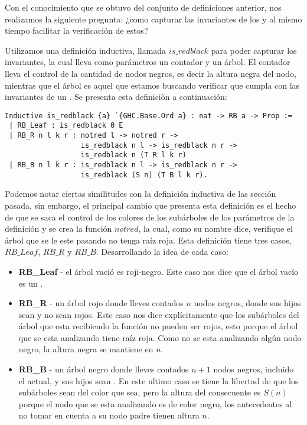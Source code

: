 Con el conocimiento que se obtuvo del conjunto de definiciones anterior, nos realizamos la
siguiente pregunta: ¿como capturar las invariantes de los {\arns} y al mismo tiempo facilitar la
verificaci\'on de estos?

Utilizamos una definición inductiva, llamada $is\_redblack$ para poder capturar los invariantes,
la cual lleva como parámetros un contador y un \'arbol. El contador lleva el control de la
cantidad de nodos negros, es decir la altura negra del nodo, mientras que el \'arbol es aquel que
estamos buscando verificar que cumpla con las invariantes de un {\arn}. Se presenta esta definici\`
on a continuaci\'on:

\begin{verbatim}
Inductive is_redblack {a} `{GHC.Base.Ord a} : nat -> RB a -> Prop :=
 | RB_Leaf : is_redblack 0 E
 | RB_R n l k r : notred l -> notred r ->
                  is_redblack n l -> is_redblack n r ->
                  is_redblack n (T R l k r)
 | RB_B n l k r : is_redblack n l -> is_redblack n r ->
                  is_redblack (S n) (T B l k r).
\end{verbatim}

Podemos notar ciertas similitudes con la definición inductiva de las secci\'on pasada, sin
embargo, el
principal cambio que presenta esta definición es el hecho de que se saca el control de los colores
de los subárboles de los parámetros de la definici\'on y se crea la funci\'on $notred$, la cual,
como su nombre dice, verifique el \'arbol que se le este pasando no tenga raíz roja. Esta
definici\'on tiene tres casos,$RB\_Leaf$, $RB\_R$ y $RB\_B$. Desarrollando la idea de cada caso:

\begin{itemize}
        \item \textbf{RB\_Leaf} - el árbol vació es roji-negro. Este caso nos dice que el \'arbol
        vacío es un {\arn}.
        \item \textbf{RB\_R} - un árbol rojo donde lleves contados $n$ nodos negros, donde sus
        hijos sean{\arns} y no sean rojos. Este caso nos dice explícitamente que los subárboles
        del árbol que esta recibiendo la función no pueden ser rojos, esto porque el árbol que se
        esta analizando tiene raíz roja. Como no se esta analizando algún nodo negro, la altura
        negra se mantiene en $n$.
        \item \textbf{RB\_B} - un árbol negro donde lleves contados $n+1$ nodos negros, incluido
        el actual, y sus hijos sean {\arns}. En este ultimo caso se tiene la libertad de que los
        subárboles sean del color que sea, pero la altura del consecuente es $S(n)$ porque el nodo
        que se esta analizando es de color negro, los antecedentes al no tomar en cuenta a su nodo
        padre tienen altura $n$.
\end{itemize}

